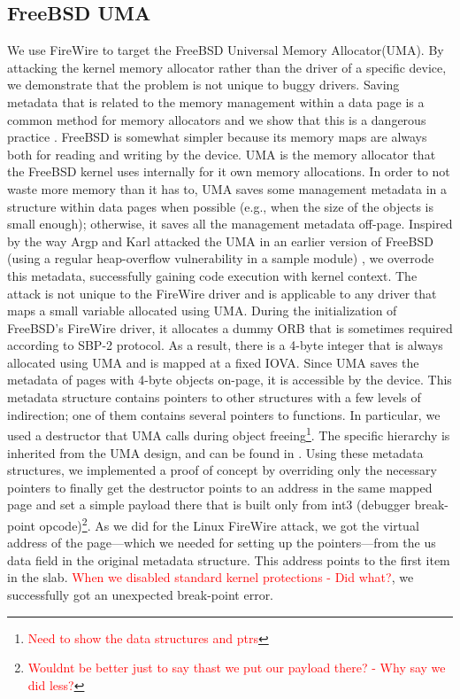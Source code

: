 \subsection{FreeBSD UMA}
We use FireWire to target the FreeBSD Universal Memory Allocator(UMA). By attacking the kernel memory allocator rather than the driver of a specific device, we demonstrate that the problem is not unique to buggy drivers. Saving metadata that is related to the memory management within a data page is a common method for memory allocators and we show that this is a dangerous practice \cite{Cor07, ak09}. FreeBSD is somewhat simpler because its memory maps are always both for reading and writing by the device. UMA is the memory allocator that the FreeBSD kernel uses internally for it own memory allocations. In order to not waste more memory than it has to, UMA saves some management metadata in a structure within data pages when possible (e.g., when the size of the objects is small enough); otherwise, it saves all the management metadata off-page. Inspired by the way Argp and Karl attacked the UMA in an earlier version of FreeBSD (using a regular heap-overflow vulnerability in a sample module) \cite{ak09}, we overrode this metadata, successfully gaining code execution with kernel context. The attack is not unique to the FireWire driver and is applicable to any driver that maps a small variable allocated using UMA. During the initialization of FreeBSD’s FireWire driver, it allocates a dummy ORB that is sometimes required according to SBP-2 protocol. As a result, there is a 4-byte integer that is always allocated using UMA and is mapped at a fixed IOVA. Since UMA saves the metadata of pages with 4-byte objects on-page, it is accessible by the device. This metadata structure contains pointers to other structures with a few levels of indirection; one of them contains several pointers to functions. In particular, we used a destructor that UMA calls during object freeing\footnote{\textcolor{red}{Need to show the data structures and ptrs}}. The specific hierarchy is inherited from the UMA design, and can be found in \cite{aA10}. Using these metadata structures, we implemented a proof of concept by overriding only the necessary pointers to finally get the destructor points to an address in the same mapped page and set a simple payload there that is built only from int3 (debugger break-point opcode)\footnote{\textcolor{red}{Wouldnt be better just to say thast we put our payload there? - Why say we did less?}}. As we did for the Linux FireWire attack, we got the virtual address of the page—which we needed for setting up the pointers—from the us data field in the original metadata structure. This address points to the first item in the slab. \textcolor{red}{When we disabled standard kernel protections - Did what?}, we successfully got an unexpected break-point error.